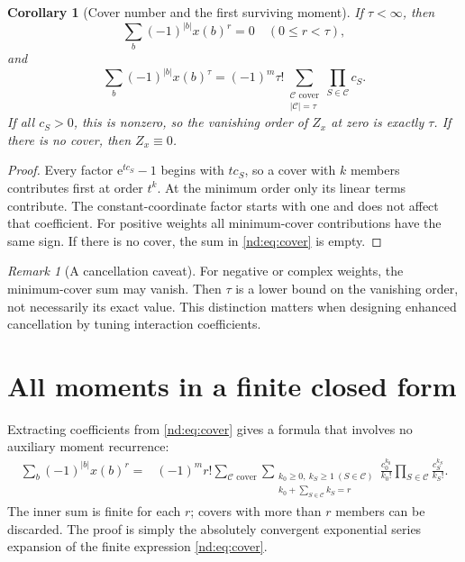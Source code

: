 \documentclass[11pt,a4paper,oneside,openany]{book}
\numberwithin{equation}{chapter}
\newtheorem{corollary}[theorem]{Corollary}
\theoremstyle{definition}
\theoremstyle{remark}
\newtheorem{remark}[theorem]{Remark}
\newcommand{\e}{\mathrm e}
\newcommand{\CCov}{\mathcal C}
\begin{document}
\begin{corollary}[Cover number and the first surviving moment]
\label{nd:cor:coverorder}
If \(\tau<\infty\), then
\begin{equation}
 \sum_b(-1)^{|b|}x(b)^r=0\quad(0\le r<\tau),
 \label{nd:eq:covervanish}
\end{equation}
and
\begin{equation}
 \sum_b(-1)^{|b|}x(b)^\tau
 =(-1)^m\tau!
  \sum_{\substack{\CCov\text{ cover}\\|\CCov|=\tau}}
       \prod_{S\in\CCov}c_S.
 \label{nd:eq:coverlead}
\end{equation}
If all \(c_S>0\), this is nonzero, so the vanishing order of \(Z_x\) at zero
is exactly \(\tau\). If there is no cover, then \(Z_x\equiv0\).
\end{corollary}
\begin{proof}
Every factor \(\e^{tc_S}-1\) begins with \(tc_S\), so a cover with \(k\)
members contributes first at order \(t^k\). At the minimum order only its
linear terms contribute. The constant-coordinate factor starts with one and
does not affect that coefficient. For positive weights all minimum-cover
contributions have the same sign. If there is no cover, the sum in
\eqref{nd:eq:cover} is empty.
\end{proof}

\begin{remark}[A cancellation caveat]
For negative or complex weights, the minimum-cover sum may vanish. Then
\(\tau\) is a lower bound on the vanishing order, not necessarily its exact
value. This distinction matters when designing enhanced cancellation by tuning
interaction coefficients.
\end{remark}

\section{All moments in a finite closed form}
Extracting coefficients from \eqref{nd:eq:cover} gives a formula that involves no
auxiliary moment recurrence:
\begin{equation}
\begin{split}
 \sum_b(-1)^{|b|}x(b)^r
  ={}&(-1)^m r!\sum_{\CCov\text{ cover}}
       \sum_{\substack{k_0\ge0,\ k_S\ge1\ (S\in\CCov)\\
                       k_0+\sum_{S\in\CCov}k_S=r}}
       \frac{c_0^{k_0}}{k_0!}
       \prod_{S\in\CCov}\frac{c_S^{k_S}}{k_S!}.
\end{split}
\label{nd:eq:allmoments}
\end{equation}
The inner sum is finite for each \(r\); covers with more than \(r\) members
can be discarded. The proof is simply the absolutely convergent exponential
series expansion of the finite expression \eqref{nd:eq:cover}.
\end{document}
